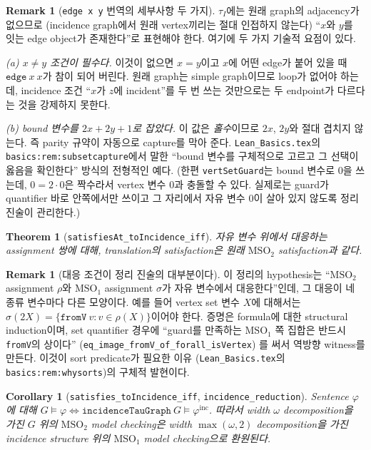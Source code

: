 \documentclass[11pt]{article}
\theoremstyle{definition}
\newtheorem{remark}[definition]{Remark}
\theoremstyle{plain}
\newtheorem{theorem}[definition]{Theorem}
\newtheorem{corollary}[definition]{Corollary}
\newcommand{\MSOtwo}{\mathrm{MSO}_2}
\newcommand{\MSOone}{\mathrm{MSO}_1}
\newcommand{\lean}[1]{\texttt{#1}}
\newcommand{\leanfile}[1]{\texttt{#1}}
\begin{document}
\begin{remark}[\lean{edge x y} 번역의 세부사항 두 가지]
\label{mso:rem:edgeatom}
$\tau_I$에는 원래 graph의 adjacency가 없으므로 (incidence graph에서 원래
vertex끼리는 절대 인접하지 않는다) ``$x$와 $y$를 잇는 edge object가 존재한다''로
표현해야 한다. 여기에 두 가지 기술적 요점이 있다.

\emph{(a) $x \ne y$ 조건이 필수다.} 이것이 없으면 $x = y$이고 $x$에 어떤 edge가
붙어 있을 때 $\lean{edge}\ x\ x$가 참이 되어 버린다. 원래 graph는 simple
graph이므로 loop가 없어야 하는데, incidence 조건 ``$x$가 $z$에 incident''를 두 번
쓰는 것만으로는 두 endpoint가 다르다는 것을 강제하지 못한다.

\emph{(b) bound 변수를 $2x + 2y + 1$로 잡았다.} 이 값은 \emph{홀수}이므로
$2x$, $2y$와 절대 겹치지 않는다. 즉 parity 규약이 자동으로 capture를 막아
준다. \leanfile{Lean\_Basics.tex}의 \lean{basics:rem:subsetcapture}에서 말한
``bound 변수를 구체적으로 고르고 그 선택이 옳음을 확인한다'' 방식의 전형적인
예다. (한편 \lean{vertSetGuard}는 bound 변수로 $0$을 쓰는데, $0 = 2 \cdot 0$은
짝수라서 vertex 변수 $0$과 충돌할 수 있다. 실제로는 guard가 quantifier 바로
안쪽에서만 쓰이고 그 자리에서 자유 변수 $0$이 살아 있지 않도록 정리 진술이
관리한다.)
\end{remark}

\begin{theorem}[\lean{satisfiesAt\_toIncidence\_iff}]
\label{mso:thm:toincidence}
자유 변수 위에서 대응하는 assignment 쌍에 대해, translation의 satisfaction은
원래 $\MSOtwo$ satisfaction과 같다.
\end{theorem}

\begin{remark}[대응 조건이 정리 진술의 대부분이다]
이 정리의 hypothesis는 ``$\MSOtwo$ assignment $\rho$와 $\MSOone$ assignment
$\sigma$가 자유 변수에서 대응한다''인데, 그 대응이 네 종류 변수마다 다른
모양이다. 예를 들어 vertex set 변수 $X$에 대해서는
$\sigma(2X) = \{\lean{fromV}\ v : v \in \rho(X)\}$이어야 한다.
증명은 formula에 대한 structural induction이며, set quantifier 경우에
``guard를 만족하는 $\MSOone$ 쪽 집합은 반드시 \lean{fromV}의 상이다''
(\lean{eq\_image\_fromV\_of\_forall\_isVertex}) 를 써서 역방향 witness를
만든다. 이것이 sort predicate가 필요한 이유
(\leanfile{Lean\_Basics.tex}의 \lean{basics:rem:whysorts})의 구체적 발현이다.
\end{remark}

\begin{corollary}[\lean{satisfies\_toIncidence\_iff}, \lean{incidence\_reduction}]
\label{mso:cor:incidencereduction}
Sentence $\varphi$에 대해
$G \models \varphi \iff \lean{incidenceTauGraph}\ G \models \varphi^{\mathrm{inc}}$.
따라서 width $\omega$ decomposition을 가진 $G$ 위의 $\MSOtwo$ model checking은
width $\max(\omega,2)$ decomposition을 가진 incidence structure 위의 $\MSOone$
model checking으로 환원된다.
\end{corollary}
\end{document}
